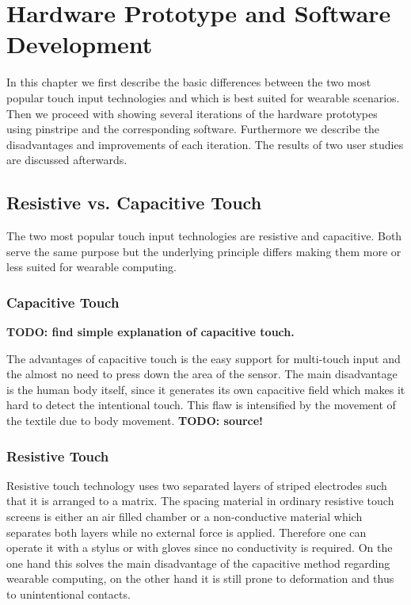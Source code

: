 %

\chapter{Hardware Prototype and Software Development}
\label{Hardware Prototype and Software Development} 
In this chapter we first describe the basic differences between the two most popular touch input technologies and which is best suited for wearable scenarios. Then we proceed with showing several iterations of the hardware prototypes using pinstripe and the corresponding software. Furthermore we describe the disadvantages and improvements of each iteration. The results of two user studies are discussed afterwards. 
\section{Resistive vs. Capacitive Touch}
The two most popular touch input technologies are resistive and capacitive. Both serve the same purpose but the underlying principle differs making them more or less suited for wearable computing. 
\subsection{Capacitive Touch}
\textbf{TODO: find simple explanation of capacitive touch.}

The advantages of capacitive touch is the easy support for multi-touch input and the almost no need to press down the area of the sensor. The main disadvantage is the human body itself, since  it generates its own capacitive field which makes it hard to detect the intentional touch. This flaw is intensified by the movement of the textile due to body movement. \textbf{TODO: source!}

\subsection{Resistive Touch}
Resistive touch technology uses two separated layers of striped electrodes such that it is arranged to a matrix. The spacing material in ordinary resistive touch screens is either an air filled chamber or a non-conductive material which separates both layers while no external force is applied. Therefore one can operate it with a stylus or with gloves since no conductivity is required. On the one hand this solves the main disadvantage of the capacitive method regarding wearable computing, on the other hand it is still prone to deformation and thus to unintentional contacts.

